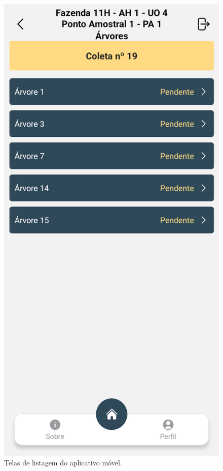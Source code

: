 \begin{figure}[H]
\begin{minipage}[b]{0.30\textwidth}
    \end{minipage}
    \hspace{3pt}
    \begin{minipage}[b]{0.30\textwidth}
        \centering
        \includegraphics[width=\textwidth]{images/app/09-trees.png}
    \end{minipage}
    
    \caption{Telas de listagem do aplicativo móvel.}
    \label{fig:ListScreens}
\end{figure}

